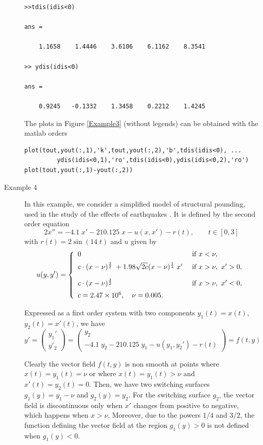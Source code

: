 \documentclass{article}
\begin{document}
\begin{description}
\begin{verbatim}
>>tdis(idis<0)

ans =

    1.1658    1.4446    3.6106    6.1162    8.3541

>> ydis(idis<0)

ans =

    0.9245   -0.1332    1.3458    0.2212    1.4245

\end{verbatim}

The plots in Figure \ref{Example3} (without legends) can be obtained with the matlab orders

\begin{verbatim}
plot(tout,yout(:,1),'k',tout,yout(:,2),'b',tdis(idis<0), ...
         ydis(idis<0,1),'ro',tdis(idis<0),ydis(idis<0,2),'ro')
plot(tout,yout(:,1)-yout(:,2))
\end{verbatim}

\item[Example 4]
In this example, we consider a simplified model of structural pounding, used in the study of the effects of earthquakes \cite{Jank:05}.
It is defined by the second order equation
\[
2 x'' = -4.1\; x' - 210.125\; x - u(x, x')- r(t), \qquad t\in[0,3]
\]
with $r(t) = 2 \sin(14\; t)$ and $u$ given by
\[
u(y,y')= \left\{
\begin{array}{ll}
0  & \hbox{ if } x < \nu, \\[5pt]
c \cdot(x-\nu)^\frac{3}{2}\; + 1.98 \sqrt{2c} (x-\nu)^\frac{1}{4}\; x'
& \hbox{ if }  x > \nu, \  x'>0, \\[10pt]
c \cdot (x-\nu)^\frac{3}{2} & \hbox{ if }  x > \nu, \  x'<0, \\[5pt]
c=2.47\times 10^6, \quad \nu=0.005. &
\end{array}
\right.
\]

Expressed as a first order system with
two components $y_1(t)=x(t)$, $y_2(t)=x'(t)$, we have
\[
y'=\begin{pmatrix} y_1' \\y'_2 \end{pmatrix}=
\begin{pmatrix} y_2 \\ -4.1\; y_2 - 210.125\; y_1 - u(y_1, y_2')- r(t)
\end{pmatrix} = f(t,y)
\]

\medskip

Clearly the vector field $f(t,y)$ is non smooth at points where $x(t)=y_1(t)=\nu$
or where $x(t)=y_1(t) > \nu$ and  $x'(t)=y_2(t)=0$.
Then, we have two switching surfaces  $g_1(y)=y_1-\nu$ and $g_2(y)=y_2$.
For the switching surface $g_2$, the vector field is
discontinuous only when $x'$ changes from positive to negative,
which happens when $x > \nu$.
Moreover, due to the powers $1/4$ and $3/2$, the function
defining the vector field at the region $g_1(y) >0$ is not defined when
$g_1(y) <0$.


\end{description}
\end{document}
